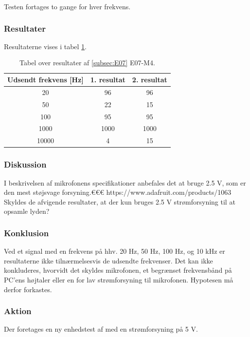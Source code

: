 			Testen fortages to gange for hver frekvens.  
		
		\subsubsection{Resultater}
		Resultaterne vises i tabel \ref{elektrettoresultater}. 
		\begin{table}[htb]
				\centering
				\caption{Tabel over resultater af \ref{subsec:E07} E07-M4.} 
				\label{elektrettoresultater}
				\begin{tabular}{ccc}
					\multicolumn{1}{c|}{\textbf{Udsendt frekvens {[}Hz{]}}} & 	
					\multicolumn{1}{c|}{\textbf{1. resultat}} & \textbf{2. resultat} \\ \hline
					\multicolumn{1}{c|}{20}& 
					\multicolumn{1}{c|}{96}&96\\
					\multicolumn{1}{c|}{50}& 
					\multicolumn{1}{c|}{22}&15\\
					\multicolumn{1}{c|}{100}& 
					\multicolumn{1}{c|}{95}&95\\
					\multicolumn{1}{c|}{1000}& 
					\multicolumn{1}{c|}{1000}&1000\\
					\multicolumn{1}{c|}{10000}& 
					\multicolumn{1}{c|}{4}&15\\
                   
				\end{tabular}
			\end{table}
		
		\subsubsection{Diskussion} 
		I beskrivelsen af mikrofonens specifikationer anbefales det at bruge 2.5 V, som er den mest støjsvage forsyning.€€€ https://www.adafruit.com/products/1063 Skyldes de afvigende resultater, at der kun bruges 2.5 V strømforsyning til at opsamle lyden?
		\subsubsection{Konklusion}
	Ved et signal med en frekvens på hhv. 20 Hz, 50 Hz, 100 Hz, og 10 kHz er resultaterne ikke tilnærmelsesvis de udsendte frekvenser. 
	Det kan ikke konkluderes, hvorvidt det skyldes mikrofonen, et begrænset frekvensbånd på PC'ens højtaler eller en for lav strømforsyning til mikrofonen. Hypotesen må derfor forkastes. 
		\subsubsection{Aktion}
		Der foretages en ny enhedstest af \elektretto{} med en strømforsyning på 5 V. 
		
